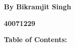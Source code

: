 \documentclass[12pt]{article}
\begin{document}
\vspace{\baselineskip}

\vspace{\baselineskip}
\begin{FlushRight}
{\fontsize{15pt}{18.0pt}\selectfont \textbf{By Bikramjit Singh}\par}
\end{FlushRight}\par

\begin{FlushRight}
{\fontsize{15pt}{18.0pt}\selectfont \textbf{40071229}\par}
\end{FlushRight}\par


\vspace{\baselineskip}

\vspace{\baselineskip}

\vspace{\baselineskip}

\vspace{\baselineskip}

\vspace{\baselineskip}

\vspace{\baselineskip}

\vspace{\baselineskip}

\vspace{\baselineskip}

\vspace{\baselineskip}

\vspace{\baselineskip}

\vspace{\baselineskip}

\vspace{\baselineskip}

\vspace{\baselineskip}

\vspace{\baselineskip}

\vspace{\baselineskip}

\vspace{\baselineskip}

\vspace{\baselineskip}

\vspace{\baselineskip}
\textbf{Table of Contents:}\par
\end{document}
